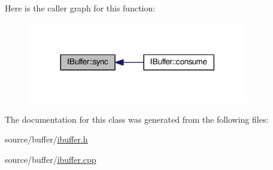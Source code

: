Here is the caller graph for this function\-:
\nopagebreak
\begin{figure}[H]
\begin{center}
\leavevmode
\includegraphics[width=272pt]{class_i_buffer_aa61fe968b6058c01883bf4a464e7089f_icgraph}
\end{center}
\end{figure}




The documentation for this class was generated from the following files\-:\begin{DoxyCompactItemize}
\item 
source/buffer/\hyperlink{ibuffer_8h}{ibuffer.\-h}\item 
source/buffer/\hyperlink{ibuffer_8cpp}{ibuffer.\-cpp}\end{DoxyCompactItemize}
